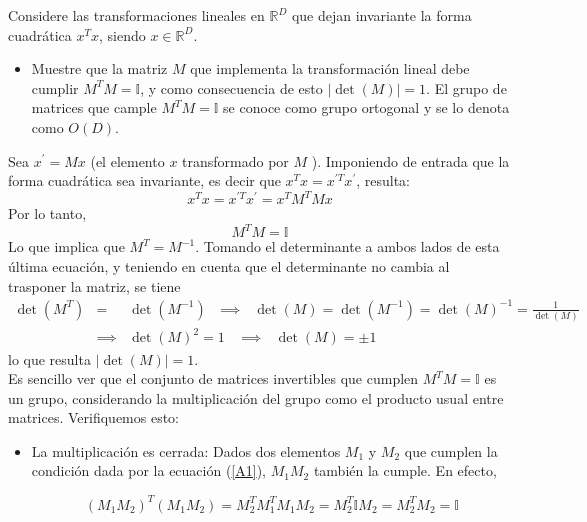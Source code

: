 \begin{exercise}
Considere las transformaciones lineales en $\mathbb{R}^{D}$ que dejan invariante la forma cuadrática $x^{T} x$, siendo $x \in \mathbb{R}^{D}$.
\begin{itemize}
    \item[a)] Muestre que la matriz $M$ que implementa la transformación lineal debe cumplir $M^{T} M=\mathbb{I}$, y como consecuencia de esto $|\operatorname{det}(M)|=1$. El grupo de matrices que cample $M^{T} M=\mathbb{I}$ se conoce como grupo ortogonal y se lo denota como $O(D)$.
\end{itemize}
\end{exercise}
\begin{solution}
Sea $x^{\prime}=Mx$ (el elemento $x$ transformado por $M$ ). Imponiendo de entrada que la forma cuadrática sea invariante, es decir que $x^{T}x=x^{\prime T}x^{\prime}$, resulta: 
\begin{equation*}
    x^{T} x=x^{\prime T} x^{\prime}=x^{T} M^{T} M x
\end{equation*}
Por lo tanto,
\begin{equation}
    M^{T} M=\mathbb{I}
    \label{A1}
\end{equation}
Lo que implica que $M^{T}=M^{-1}$. Tomando el determinante a ambos lados de esta última ecuación, y teniendo en cuenta que el determinante no cambia al trasponer la matriz, se tiene
\begin{eqnarray*}
\det \left( M^{T}\right)  &=&\det \left( M^{-1}\right) ~\ \ \implies ~\ \
\det \left( M\right) =\det \left( M^{-1}\right) =\det \left( M\right) ^{-1}=%
\frac{1}{\det \left( M\right) } \\
&\implies &\det \left( M\right) ^{2}=1~~\ \ \implies ~\ \ \det \left(
M\right) =\pm 1
\end{eqnarray*}
lo que resulta $|\operatorname{det}(M)|=1$.\\

Es sencillo ver que el conjunto de matrices invertibles que cumplen $M^{T} M=\mathbb{I}$ es un grupo, considerando la multiplicación del grupo como el producto usual entre matrices. Verifiquemos esto:
\vspace{0.2cm}
\begin{itemize}
    \item La multiplicación es cerrada: Dados dos elementos $M_{1}$ y $M_{2}$ que cumplen la condición dada por la ecuación (\ref{A1}), $M_{1} M_{2}$ también la cumple. En efecto,
    
\begin{equation}
    \left(M_{1} M_{2}\right)^{T}\left(M_{1} M_{2}\right)=M_{2}^{T} M_{1}^{T} M_{1} M_{2}=M_{2}^{T}\mathbb{I}M_{2}=M_{2}^{T} M_{2}=\mathbb{I}
\end{equation}


\end{itemize}
\end{solution}
